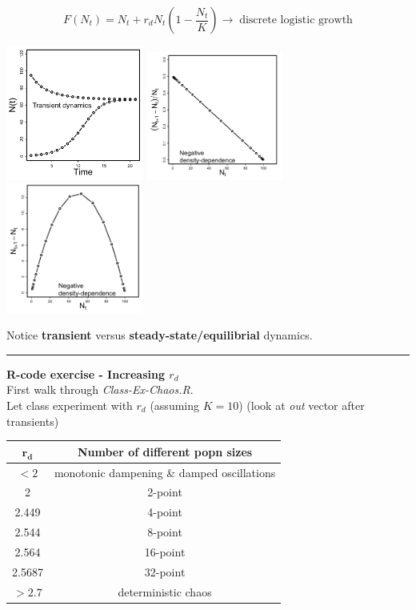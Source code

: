 \documentclass{article}
\newcommand{\note}[1]{\colorbox{gray!30}{#1}}
\begin{document}
\begin{equation*}
	F(N_t)=N_t + r_d N_t \left(1-\frac{N_t}{K}\right) \to \; \text{discrete logistic growth}
\end{equation*}
\begin{center}
\includegraphics[width=4.5cm]{figs/d.png}
\includegraphics[width=4.5cm]{figs/e.png}
\includegraphics[width=4.5cm]{figs/f.png}
\end{center}

Notice \textbf{transient} versus \textbf{steady-state/equilibrial} dynamics.

\rule[0.5ex]{\linewidth}{1pt}


\textbf{R-code exercise - Increasing $r_d$}\\
\note{First walk through \emph{Class-Ex-Chaos.R}.}  \\
\note{Let class experiment with $r_d$ (assuming $K=10$)} (look at \emph{out} vector after transients)

\begin{table}[h]
\centering
\begin{tabular}{cc}
$\mathbf{r_d}$ & \textbf{Number of different popn sizes} \\ 
\hline
 $<2$ & monotonic dampening \& damped oscillations \\ 
2 &  2-point \\ 
2.449 & 4-point \\ 
2.544 & 8-point \\ 
2.564 &  16-point\\ 
2.5687 & 32-point \\ 
$> 2.7$ & deterministic chaos \\ 
 \hline
\end{tabular} 
\end{table}
\end{document}
